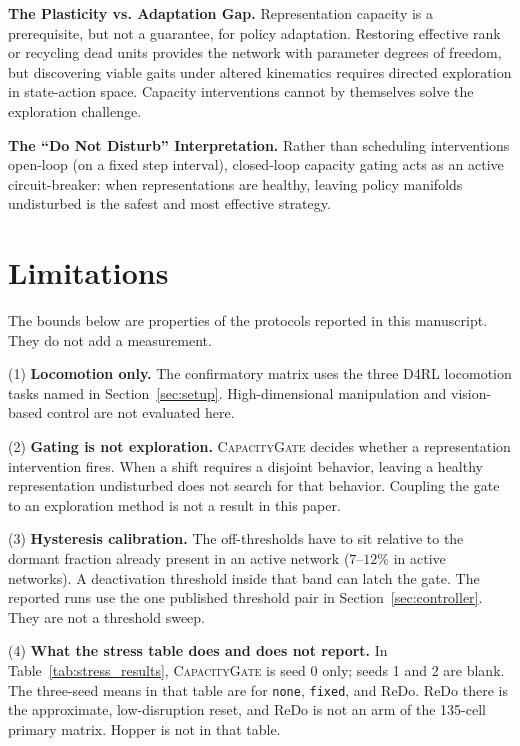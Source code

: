 \documentclass{article}
\begin{document}
\textbf{The Plasticity vs. Adaptation Gap.} Representation capacity is a prerequisite, but not a guarantee, for policy adaptation. Restoring effective rank or recycling dead units provides the network with parameter degrees of freedom, but discovering viable gaits under altered kinematics requires directed exploration in state-action space. Capacity interventions cannot by themselves solve the exploration challenge.

\textbf{The ``Do Not Disturb'' Interpretation.} Rather than scheduling interventions open-loop (on a fixed step interval), closed-loop capacity gating acts as an active circuit-breaker: when representations are healthy, leaving policy manifolds undisturbed is the safest and most effective strategy.

\section{Limitations}
\label{sec:limitations}

The bounds below are properties of the protocols reported in this manuscript. They do not add a measurement.

(1) \textbf{Locomotion only.} The confirmatory matrix uses the three D4RL locomotion tasks named in Section~\ref{sec:setup}. High-dimensional manipulation and vision-based control are not evaluated here.

(2) \textbf{Gating is not exploration.} \textsc{CapacityGate} decides whether a representation intervention fires. When a shift requires a disjoint behavior, leaving a healthy representation undisturbed does not search for that behavior. Coupling the gate to an exploration method is not a result in this paper.

(3) \textbf{Hysteresis calibration.} The off-thresholds have to sit relative to the dormant fraction already present in an active network ($7\text{--}12\%$ in active networks). A deactivation threshold inside that band can latch the gate. The reported runs use the one published threshold pair in Section~\ref{sec:controller}. They are not a threshold sweep.

(4) \textbf{What the stress table does and does not report.} In Table~\ref{tab:stress_results}, \textsc{CapacityGate} is seed 0 only; seeds 1 and 2 are blank. The three-seed means in that table are for \texttt{none}, \texttt{fixed}, and ReDo. ReDo there is the approximate, low-disruption reset, and ReDo is not an arm of the 135-cell primary matrix. Hopper is not in that table.
\end{document}
